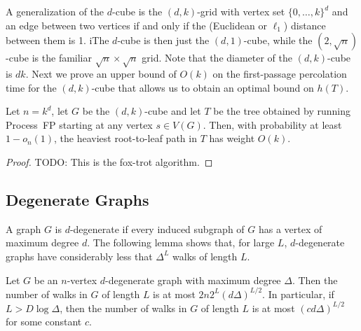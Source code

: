\documentclass[lotsofwhite]{patmorin}
\begin{document}
A generalization of the $d$-cube is the $(d,k)$-grid with vertex set
$\{0,\ldots,k\}^d$ and an edge between two vertices if and only if
the (Euclidean or $\ell_1$) distance between them is 1. iThe $d$-cube
is then just the $(d,1)$-cube, while the $(2,\sqrt{n})$-cube is the
familiar $\sqrt{n}\times\sqrt{n}$ grid.  Note that the diameter of the
$(d,k)$-cube is $dk$.  Next we prove an upper bound of $O(k)$ on the
first-passage percolation time for the $(d,k)$-cube that allows us to
obtain an optimal bound on $h(T)$.

\begin{thm}
  Let $n=k^d$, let $G$ be the $(d,k)$-cube and let $T$ be the tree obtained
  by running Process~FP starting at any vertex $s\in V(G)$.  Then,
  with probability at least $1-o_n(1)$, the heaviest root-to-leaf path
  in $T$ has weight $O(k)$.
\end{thm}

\begin{proof}
   TODO: This is the fox-trot algorithm.
\end{proof}



\subsection{Degenerate Graphs}

A graph $G$ is $d$-degenerate if every induced subgraph of $G$ has
a vertex of maximum degree $d$.  The following lemma shows that, for
large $L$, $d$-degenerate graphs have considerably less that $\Delta^L$
walks of length $L$.

\begin{lem}
   Let $G$ be an $n$-vertex $d$-degenerate graph with maximum degree
   $\Delta$.  Then the number of walks in $G$ of length $L$ is at most
   $2n2^{L}(d\Delta)^{L/2}$.  In particular, if $L > D\log\Delta$, then
   the number of walks in $G$ of length $L$ is at most $(cd\Delta)^{L/2}$
   for some constant $c$.
\end{lem}
\end{document}
